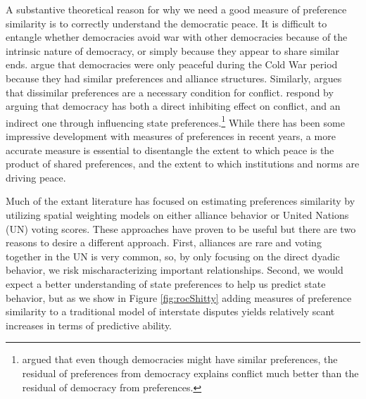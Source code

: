 \documentclass[12pt,pdflatex]{elsarticle}
\begin{document}
A substantive theoretical reason for why we need a good measure of preference similarity is to correctly understand the democratic peace. It is difficult to entangle whether democracies avoid war with other democracies because of the intrinsic nature of democracy, or simply because they appear to share similar ends. \citet{farber:gowa:1995} argue that democracies were only peaceful during the Cold War period because they had similar preferences and alliance structures. Similarly, \citet{gartzke:1998} argues that dissimilar preferences are a necessary condition for conflict. \citet{oneal:russett:1999e} respond by arguing that democracy has both a direct inhibiting effect on conflict, and an indirect one through influencing state preferences.\footnote{\citet{gartzke:2000} argued that even though democracies might have similar preferences, the residual of preferences from democracy explains conflict much better than the residual of democracy from preferences.} While there has been some impressive development with measures of preferences in recent years, a more accurate measure is essential to disentangle the extent to which peace is the product of shared preferences, and the extent to which institutions and norms are driving peace.

Much of the extant literature has focused on estimating preferences similarity by utilizing spatial weighting models on either alliance behavior or United Nations (UN) voting scores. These approaches have proven to be useful but there are two reasons to desire a different approach. First, alliances are rare and voting together in the UN is very common, so, by only focusing on the direct dyadic behavior, we risk mischaracterizing important relationships. Second, we would expect a better understanding of state preferences to help us predict state behavior, but as we show in Figure \ref{fig:rocShitty} adding measures of  preference similarity to a traditional model of interstate disputes yields relatively scant increases in terms of predictive ability.
\end{document}
